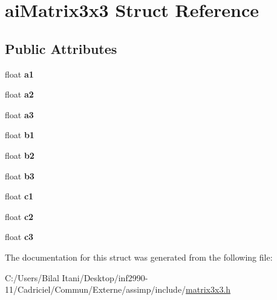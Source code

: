 \hypertarget{structai_matrix3x3}{}\section{ai\+Matrix3x3 Struct Reference}
\label{structai_matrix3x3}
\subsection*{Public Attributes}
\begin{DoxyCompactItemize}
\item 
float {\bfseries a1}\hypertarget{structai_matrix3x3_a6884258a2f50758ed8b554b531186917}{}\label{structai_matrix3x3_a6884258a2f50758ed8b554b531186917}

\item 
float {\bfseries a2}\hypertarget{structai_matrix3x3_a4c74733870193040ba4953fb673e77df}{}\label{structai_matrix3x3_a4c74733870193040ba4953fb673e77df}

\item 
float {\bfseries a3}\hypertarget{structai_matrix3x3_a851d391df32a39e1ced1a9a286b38cf4}{}\label{structai_matrix3x3_a851d391df32a39e1ced1a9a286b38cf4}

\item 
float {\bfseries b1}\hypertarget{structai_matrix3x3_a9eeba340d3502017caad70416f03863a}{}\label{structai_matrix3x3_a9eeba340d3502017caad70416f03863a}

\item 
float {\bfseries b2}\hypertarget{structai_matrix3x3_a9f5e25b60bbd7bdf8f0a19cd82cc6b15}{}\label{structai_matrix3x3_a9f5e25b60bbd7bdf8f0a19cd82cc6b15}

\item 
float {\bfseries b3}\hypertarget{structai_matrix3x3_a21aa4345fe6ce2774db94d118c536d02}{}\label{structai_matrix3x3_a21aa4345fe6ce2774db94d118c536d02}

\item 
float {\bfseries c1}\hypertarget{structai_matrix3x3_ae62a2877076cbee151e89cb34567e3ca}{}\label{structai_matrix3x3_ae62a2877076cbee151e89cb34567e3ca}

\item 
float {\bfseries c2}\hypertarget{structai_matrix3x3_a8e0d85d5c46eb4f4478f1fe159be4320}{}\label{structai_matrix3x3_a8e0d85d5c46eb4f4478f1fe159be4320}

\item 
float {\bfseries c3}\hypertarget{structai_matrix3x3_aa7eef894dec22db1011092410b24f19b}{}\label{structai_matrix3x3_aa7eef894dec22db1011092410b24f19b}

\end{DoxyCompactItemize}


The documentation for this struct was generated from the following file\+:\begin{DoxyCompactItemize}
\item 
C\+:/\+Users/\+Bilal Itani/\+Desktop/inf2990-\/11/\+Cadriciel/\+Commun/\+Externe/assimp/include/\hyperlink{matrix3x3_8h}{matrix3x3.\+h}\end{DoxyCompactItemize}
